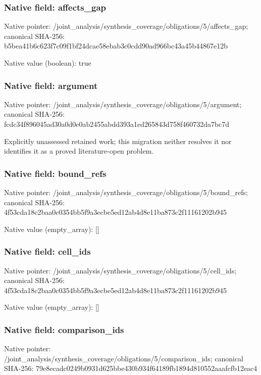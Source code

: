 \documentclass[10pt,a4paper]{article}
\begin{document}
\subsubsection{Native field: affects\_\allowbreak{}gap}
Native pointer: /joint\_\allowbreak{}analysis/synthesis\_\allowbreak{}coverage/obligations/5/affects\_\allowbreak{}gap; canonical SHA-256: b5bea41b6c623f7c09f1bf24dcae58ebab3c0cdd90ad966bc43a45b44867e12b

Native value (boolean): true

\subsubsection{Native field: argument}
Native pointer: /joint\_\allowbreak{}analysis/synthesis\_\allowbreak{}coverage/obligations/5/argument; canonical SHA-256: fcdc34f896045ad30a0d0e0ab2455abdd393a1ed265843d758f460732da7bc7d

\begingroup\raggedright\sloppy Explicitly unassessed retained work;\allowbreak{} this migration neither resolves it nor identifies it as a proved literature-open problem.\par\endgroup

\subsubsection{Native field: bound\_\allowbreak{}refs}
Native pointer: /joint\_\allowbreak{}analysis/synthesis\_\allowbreak{}coverage/obligations/5/bound\_\allowbreak{}refs; canonical SHA-256: 4f53cda18c2baa0c0354bb5f9a3ecbe5ed12ab4d8e11ba873c2f11161202b945

Native value (empty\_\allowbreak{}array): []

\subsubsection{Native field: cell\_\allowbreak{}ids}
Native pointer: /joint\_\allowbreak{}analysis/synthesis\_\allowbreak{}coverage/obligations/5/cell\_\allowbreak{}ids; canonical SHA-256: 4f53cda18c2baa0c0354bb5f9a3ecbe5ed12ab4d8e11ba873c2f11161202b945

Native value (empty\_\allowbreak{}array): []

\subsubsection{Native field: comparison\_\allowbreak{}ids}
Native pointer: /joint\_\allowbreak{}analysis/synthesis\_\allowbreak{}coverage/obligations/5/comparison\_\allowbreak{}ids; canonical SHA-256: 79e8ecadc0249b0931d625bbe430b934f64189fb1894d810552aaafcfb12eac4
\end{document}
